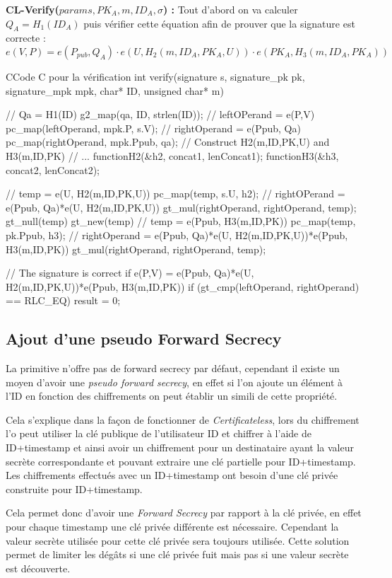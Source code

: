 \textbf{CL-Verify($params, PK_A,  m, ID_A, \sigma$) :} Tout d'abord on va calculer $Q_A = H_1(ID_A)$ puis vérifier cette équation afin de prouver que la signature est correcte :
\[e(V,P) = e(P_{pub}, Q_A) \cdot e(U, H_2(m, ID_A, PK_A,U)) \cdot e(PK_A, H_3(m, ID_A, PK_A)) \]

\begin{sourcebox}{C}{Code C pour la vérification}
	int verify(signature s, signature_pk pk, signature_mpk mpk, char* ID, unsigned char* m){
		// Qa = H1(ID)
		g2_map(qa, ID, strlen(ID));
		// leftOPerand = e(P,V)
		pc_map(leftOperand, mpk.P, s.V);
		// rightOperand = e(Ppub, Qa)
		pc_map(rightOperand, mpk.Ppub, qa);
		// Construct H2(m,ID,PK,U) and H3(m,ID,PK)
		// ...
		functionH2(&h2, concat1, lenConcat1);
		functionH3(&h3, concat2, lenConcat2);
		
		// temp = e(U, H2(m,ID,PK,U))
		pc_map(temp, s.U, h2);
		// rightOPerand = e(Ppub, Qa)*e(U, H2(m,ID,PK,U))
		gt_mul(rightOperand, rightOperand, temp);
		gt_null(temp)
		gt_new(temp)
		// temp = e(Ppub, H3(m,ID,PK))
		pc_map(temp, pk.Ppub, h3);
		// rightOperand = e(Ppub, Qa)*e(U, H2(m,ID,PK,U))*e(Ppub, H3(m,ID,PK))
		gt_mul(rightOperand, rightOperand, temp);
		
		// The signature is correct if e(P,V) = e(Ppub, Qa)*e(U, H2(m,ID,PK,U))*e(Ppub, H3(m,ID,PK))
		if (gt_cmp(leftOperand, rightOperand) == RLC_EQ) {
			result = 0;
		}
	}
\end{sourcebox}

\subsection{Ajout d'une pseudo Forward Secrecy}
\label{subsec:pseudoSecrecy}
La primitive n'offre pas de forward secrecy par défaut, cependant il existe un moyen d'avoir une \textit{pseudo forward secrecy}, en effet si l'on ajoute un élément à l'ID en fonction des chiffrements on peut établir un simili de cette propriété.

Cela s'explique dans la façon de fonctionner de \textit{Certificateless}, lors du chiffrement l'o peut utiliser la clé publique de l'utilisateur ID et chiffrer à l'aide de ID+timestamp et ainsi avoir un chiffrement pour un destinataire ayant la valeur secrète correspondante et pouvant extraire une clé partielle pour ID+timestamp. Les chiffrements effectués avec un ID+timestamp ont besoin d'une clé privée construite pour ID+timestamp.

Cela permet donc d'avoir une \textit{Forward Secrecy} par rapport à la clé privée, en effet pour chaque timestamp une clé privée différente est nécessaire. Cependant la valeur secrète utilisée pour cette clé privée sera toujours utilisée. Cette solution permet de limiter les dégâts si une clé privée fuit mais pas si une valeur secrète est découverte.

